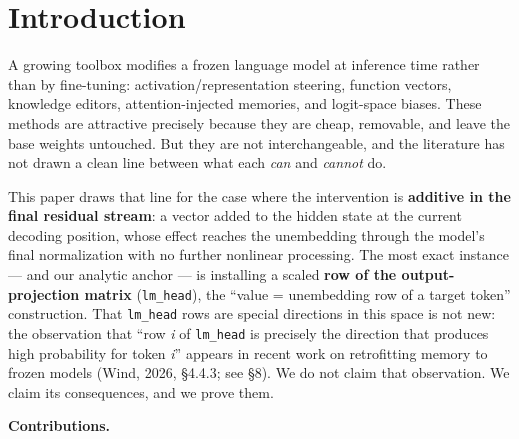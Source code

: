\documentclass[11pt]{article}
\theoremstyle{plain}
\theoremstyle{definition}
\begin{document}
\section{Introduction}

A growing toolbox modifies a frozen language model at inference time rather than by fine-tuning: activation/representation steering, function vectors, knowledge editors, attention-injected memories, and logit-space biases. These methods are attractive precisely because they are cheap, removable, and leave the base weights untouched. But they are not interchangeable, and the literature has not drawn a clean line between what each \emph{can} and \emph{cannot} do.

This paper draws that line for the case where the intervention is \textbf{additive in the final residual stream}: a vector added to the hidden state at the current decoding position, whose effect reaches the unembedding through the model's final normalization with no further nonlinear processing. The most exact instance --- and our analytic anchor --- is installing a scaled \textbf{row of the output-projection matrix} (\texttt{lm\_head}), the ``value = unembedding row of a target token'' construction. That \texttt{lm\_head} rows are special directions in this space is not new: the observation that ``row \emph{i} of \texttt{lm\_head} is precisely the direction that produces high probability for token \emph{i}'' appears in recent work on retrofitting memory to frozen models (Wind, 2026, \S4.4.3; see \S8). We do not claim that observation. We claim its consequences, and we prove them.

\textbf{Contributions.}
\end{document}
